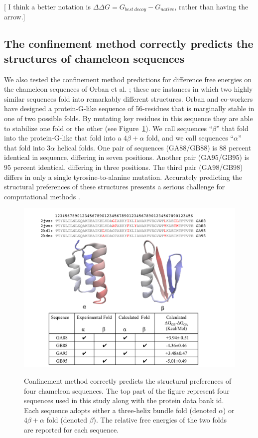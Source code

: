 \documentclass[12pt]{article}
\newcommand{\Ken}[1]{\color{red}#1\normalcolor}
\begin{document}
\Ken{[ I think a better notation is $\Delta \Delta G = G_{best~decoy} - G_{native}$, rather than having the arrow.]}

\subsection{The confinement method correctly predicts the structures of chameleon sequences}

We also tested the confinement method predictions for difference free energies on the chameleon sequences of Orban 
et al. \cite{Alexander2007,He2008,Alexander2009,Bryan2010,He2012,Shortle2009}; these 
are instances in which two highly similar sequences fold into remarkably different structures. Orban and co-workers have designed a 
protein-G-like sequence of 56-residues that
is marginally stable in one of two possible folds. By mutating key residues in this sequence they
are able to stabilize one fold or the other (see Figure~\ref{fig:orban}). We call sequences ``$\beta$'' that fold into 
the protein-G-like that fold into a $4 \beta + \alpha$ fold, and we call sequences ``$\alpha$'' that fold into $3 \alpha$ helical folds.  One pair 
of sequences (GA88/GB88) is 88 percent identical in sequence, differing in seven positions. Another pair (GA95/GB95) is 95 percent identical, 
differing in three positions. The third pair (GA98/GB98) differs in only a single tyrosine-to-alanine mutation. Accurately predicting the 
structural preferences of these structures presents a serious challenge for computational methods 
\cite{Alexander2007,He2008,Alexander2009,Bryan2010,He2012,Shortle2009}.

\begin{figure}
\includegraphics[width=5.0in]{orban.pdf}
\label{fig:orban}
\caption{Confinement method correctly predicts the structural preferences of four chameleon
sequences. The top part of the figure represent four sequences used in this study along with the
protein data bank id. Each sequence adopts either a three-helix bundle fold (denoted $\alpha$) or
$4 \beta + \alpha$ fold (denoted $\beta$). The relative free energies of
the two folds are reported for each sequence.}
\end{figure}
\end{document}

